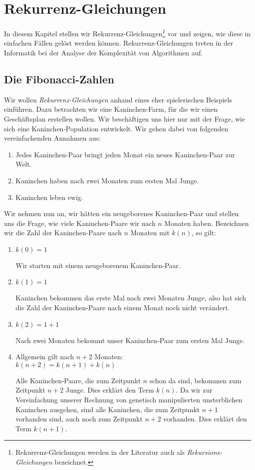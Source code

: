 \chapter{Rekurrenz-Gleichungen} 
In diesem Kapitel stellen wir 
Rekurrenz-Gleichungen\footnote{
Rekurrenz-Gleichungen werden in der Literatur auch als \emph{Rekursions-Gleichungen} bezeichnet.}
vor und zeigen, wie diese in einfachen Fällen gelöst werden können.  
Rekurrenz-Gleichungen treten in der Informatik bei der Analyse der Komplexität von
Algorithmen auf.


\section{Die Fibonacci-Zahlen}
Wir wollen \emph{Rekurrenz-Gleichungen} anhand eines eher spielerischen Beispiels
einführen.  Dazu betrachten wir eine Kaninchen-Farm, für die wir einen Geschäftsplan
erstellen wollen.   Wir beschäftigen uns hier nur mit der Frage, wie sich eine
Kaninchen-Population entwickelt.  Wir gehen dabei von folgenden vereinfachenden Annahmen aus:
\begin{enumerate}
\item Jedes Kaninchen-Paar bringt jeden Monat ein neues Kaninchen-Paar zur Welt.
\item Kaninchen haben nach zwei Monaten zum ersten Mal Junge.
\item Kaninchen leben ewig.
\end{enumerate}
Wir nehmen nun an, wir hätten ein neugeborenes Kaninchen-Paar und stellen uns die Frage, wie
viele Kaninchen-Paare wir nach $n$ Monaten haben.  Bezeichnen wir die Zahl der
Kaninchen-Paare nach $n$ Monaten mit $k(n)$, so gilt:
\begin{enumerate}
\item $k(0) = 1$

      Wir starten mit einem neugeborenem Kaninchen-Paar.
\item $k(1) = 1$

      Kaninchen bekommen das erste Mal nach zwei Monaten Junge, also hat sich die Zahl
      der Kaninchen-Paare nach einem Monat noch nicht verändert.
\item $k(2) = 1 + 1$

      Nach zwei Monaten bekommt unser Kaninchen-Paar zum ersten Mal Junge.
\item Allgemein gilt nach $n + 2$ Monaten: \\[0.2cm]
      \hspace*{1.3cm} 
      $k(n+2) = k(n+1) + k(n)$

      Alle Kaninchen-Paare, die zum Zeitpunkt $n$ schon da sind, bekommen zum Zeitpunkt
      $n+2$ Junge. Dies erklärt den Term $k(n)$.  Da wir zur Vereinfachung unserer
      Rechnung von genetisch manipulierten unsterblichen Kaninchen ausgehen, sind alle
      Kaninchen, die zum Zeitpunkt $n+1$ vorhanden sind, auch noch zum Zeitpunkt $n+2$
      vorhanden. Dies erklärt den Term $k(n+1)$. 
\end{enumerate}
